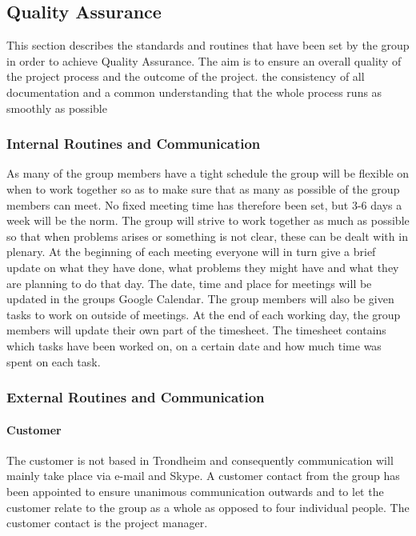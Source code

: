 \subsection{Quality Assurance}

This section describes the standards and routines that have been set by the group in order to achieve Quality Assurance. The aim is to ensure an overall quality of the project process and the outcome of the project. the consistency of all documentation and a common understanding that the whole process runs as smoothly as possible

\subsubsection{Internal Routines and Communication}

As many of the group members have a tight schedule the group will be flexible on when to work together so as to make sure that as many as possible of the group members can meet. No fixed meeting time has therefore been set, but 3-6 days a week will be the norm. The group will strive to work together as much as possible so that when problems arises or something is not clear, these can be dealt with in plenary. At the beginning of each meeting everyone will in turn give a brief update on what they have done, what problems they might have and what they are planning to do that day. The date, time and place for meetings will be updated in the groups Google Calendar. The group members will also be given tasks to work on outside of meetings. At the end of each working day, the group members will update their own part of the timesheet. The timesheet contains which tasks have been worked on, on a certain date and how much time was spent on each task. 

\subsubsection{External Routines and Communication}

\paragraph{Customer}

The customer is not based in Trondheim and consequently communication will mainly take place via e-mail and Skype. A customer contact from the group has been appointed to ensure unanimous communication outwards and to let the customer relate to the group as a whole as opposed to four individual people. The customer contact is the project manager. 


